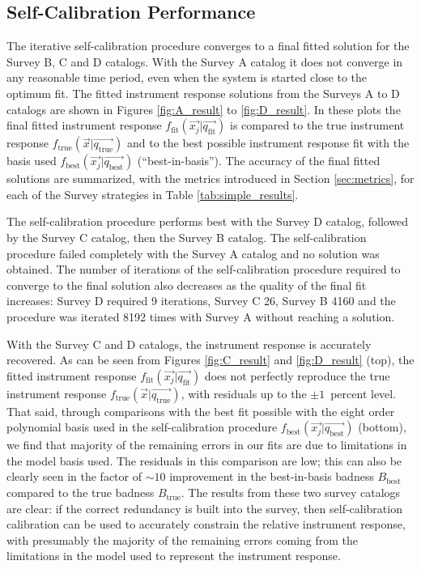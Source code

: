 \documentclass[preprint,pdftex]{aastex}
\newcommand{\true}{\text{true}}
\newcommand{\fit}{\text{fit}}
\newcommand{\basis}{\text{best}}
\begin{document}
\subsection{Self-Calibration Performance}
The iterative self-calibration procedure converges to a final fitted solution for the Survey B, C and D catalogs. With the Survey A catalog it does not converge in any reasonable time period, even when the system is started close to the optimum fit. The fitted instrument response solutions from the Surveys A to D catalogs are shown in Figures \ref{fig:A_result} to \ref{fig:D_result}. In these plots the final fitted instrument response $f_\fit(\vec{x_j} | \vec{q_\fit})$ is compared to the true instrument response $f_\true(\vec{x} | \vec{q_\true})$ and to the best possible instrument response fit with the basis used $f_\basis(\vec{x_j} | \vec{q_\basis})$ (``best-in-basis''). The accuracy of the final fitted solutions are summarized, with the metrics introduced in Section \ref{sec:metrics}, for each of the Survey strategies in Table \ref{tab:simple_results}. 

The self-calibration procedure performs best with the Survey D catalog, followed by the Survey C catalog, then the Survey B catalog. The self-calibration procedure failed completely with the Survey A catalog and no solution was obtained. The number of iterations of the self-calibration procedure required to converge to the final solution also decreases as the quality of the final fit increases: Survey D required 9 iterations, Survey C 26, Survey B 4160 and the procedure was iterated 8192 times with Survey A without reaching a solution.

With the Survey C and D catalogs, the instrument response is accurately recovered. As can be seen from Figures \ref{fig:C_result} and \ref{fig:D_result} (top), the fitted instrument response $f_\fit(\vec{x_j} | \vec{q_\fit})$ does not perfectly reproduce the true instrument response $f_\true(\vec{x} | \vec{q_\true})$, with residuals up to the $\pm 1$~percent level. That said, through comparisons with the best fit possible with the eight order polynomial basis used in the self-calibration procedure $f_\basis(\vec{x_j} | \vec{q_\basis})$ (bottom), we find that majority of the remaining errors in our fits are due to limitations in the model basis used. The residuals in this comparison are low; this can also be clearly seen in the factor of $\sim 10$ improvement in the best-in-basis badness $B_\basis$ compared to the true badness $B_\true$. The results from these two survey catalogs are clear: if the correct redundancy is built into the survey, then self-calibration calibration can be used to accurately constrain the relative instrument response, with presumably the majority of the remaining errors coming from the limitations in the model used to represent the instrument response.
\end{document}
